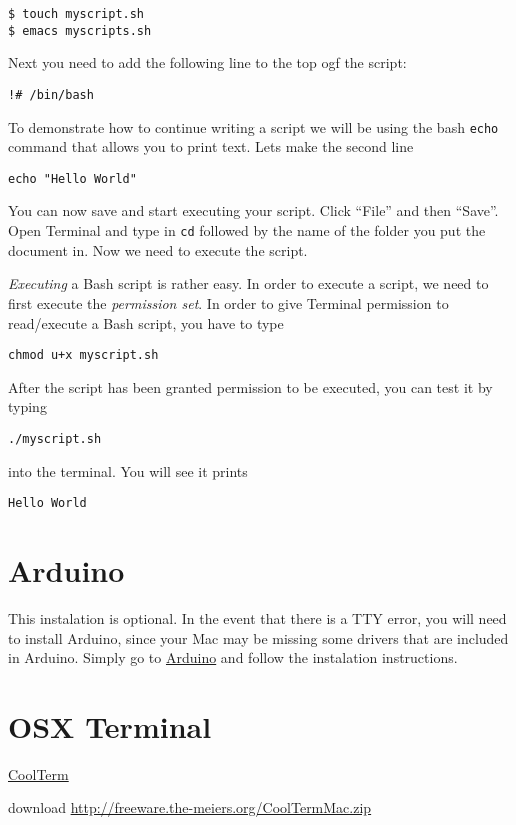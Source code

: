 \begin{verbatim}
$ touch myscript.sh
$ emacs myscripts.sh
\end{verbatim}

Next you need to add the following line to the top ogf the script:

\begin{verbatim}
!# /bin/bash
\end{verbatim}

To demonstrate how to continue writing a script we will be using the
bash \texttt{echo} command that allows you to print text. Lets make the
second line

\begin{verbatim}
echo "Hello World"
\end{verbatim}

You can now save and start executing your script. Click ``File'' and
then ``Save''. Open Terminal and type in \texttt{cd} followed by the
name of the folder you put the document in. Now we need to execute the
script.

\emph{Executing} a Bash script is rather easy. In order to execute a
script, we need to first execute the \emph{permission set}. In order to
give Terminal permission to read/execute a Bash script, you have to type

\begin{verbatim}
chmod u+x myscript.sh
\end{verbatim}

After the script has been granted permission to be executed, you can
test it by typing

\begin{verbatim}
./myscript.sh
\end{verbatim}

into the terminal. You will see it prints

\begin{verbatim}
Hello World
\end{verbatim}

\section{Arduino}\label{arduino}

This instalation is optional. In the event that there is a TTY error,
you will need to install Arduino, since your Mac may be missing some
drivers that are included in Arduino. Simply go to
\href{https://www.arduino.cc/en/guide/macOSX}{Arduino} and follow the
instalation instructions.

\section{OSX Terminal}\label{osx-terminal}

\href{https://learn.sparkfun.com/tutorials/terminal-basics/coolterm-windows-mac-linux}{CoolTerm}

download \url{http://freeware.the-meiers.org/CoolTermMac.zip}
